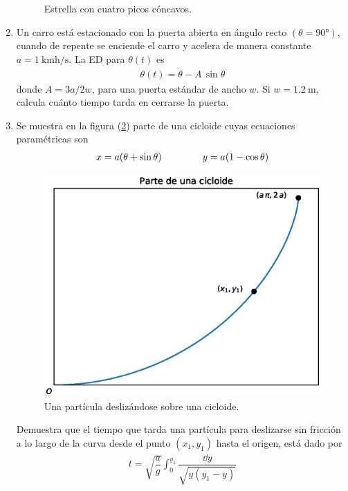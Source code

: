 \begin{enumerate}
\begin{figure}[!ht]
    \caption{Estrella con cuatro picos cóncavos.}
    \label{fig:figura_01}
\end{figure}
\item Un carro está estacionado con la puerta abierta en ángulo recto $(\theta = \ang{90})$, cuando de repente se enciende el carro y acelera de manera constante $a = \SI{1}{\kilo\meter\hour\per\second}$. La ED para $\theta(t)$ es
\begin{align*}
\theta (t) =  \ddot{\theta} - A \, \sin \theta
\end{align*}
donde $A = 3a/2w$, para una puerta estándar de ancho $w$. Si $w = \SI{1.2}{\meter}$, calcula cuánto tiempo tarda en cerrarse la puerta.
\item Se muestra en la figura (\ref{fig:figura_02}) parte de una cicloide cuyas ecuaciones paramétricas son
\begin{align*}
x = a (\theta + \sin \theta) \hspace{1.5cm} y = a (1 - \cos \theta)
\end{align*}
\begin{figure}[H]
    \centering
    \includegraphics[scale=0.7]{Imagenes/plot_cicloide.eps}
    \caption{Una partícula deslizándose sobre una cicloide.}
    \label{fig:figura_02}
\end{figure}
Demuestra que el tiempo que tarda una partícula para deslizarse sin fricción a lo largo de la curva desde el punto $(x_{1}, y_{1})$ hasta el origen, está dado por
\begin{align*}
t = \sqrt{\dfrac{a}{g}} \int_{0}^{y_{1}} \dfrac{\dd{y}}{\sqrt{y (y_{1}- y)}}

\end{align*}
\end{enumerate}

